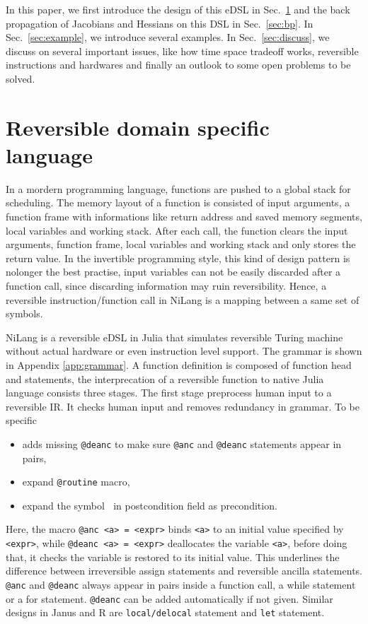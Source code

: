 \documentclass[aps,twocolumn,longbibliography,english,superscriptaddress,prr]{revtex4-1}
\newcommand{\<}{\langle}
\renewcommand{\>}{\rangle}
\newcommand{\Sec}[1]{Sec.~\ref{#1}}
\newcommand{\App}[1]{Appendix \ref{#1}}
\theoremstyle{definition}\newtheorem{definition}{\textit{Definition}}
\begin{document}
    In this paper, we first introduce the design of this eDSL in \Sec{sec:lang} and the back propagation of Jacobians and Hessians on this DSL in \Sec{sec:bp}.
    In \Sec{sec:example}, we introduce several examples.
    In \Sec{sec:discuss}, we discuss on several important issues, like how time space tradeoff works, reversible instructions and hardwares and finally an outlook to some open problems to be solved.

    \section{Reversible domain specific language}\label{sec:lang}
In a mordern programming language, functions are pushed to a global stack for scheduling. The memory layout of a function is consisted of input arguments, a function frame with informations like return address and saved memory segments, local variables and working stack. After each call, the function clears the input arguments, function frame, local variables and working stack and only stores the return value.
In the invertible programming style, this kind of design pattern is nolonger the best practise, input variables can not be easily discarded after a function call, since discarding information may ruin reversibility. Hence, a reversible instruction/function call in NiLang is a mapping between a same set of symbols.

NiLang is a reversible eDSL in Julia that simulates reversible Turing machine without actual hardware or even instruction level support. The grammar is shown in \App{app:grammar}. A function definition is composed of function head and statements, the interprecation of a reversible function to native Julia language consists three stages.
The first stage preprocess human input to a reversible IR. It checks human input and removes redundancy in grammar. To be specific
\begin{itemize}
    \item adds missing \texttt{@deanc} to make sure \texttt{@anc} and \texttt{@deanc} statements appear in pairs,
    \item expand \texttt{@routine} macro,
    \item expand the symbol \texttt{$~$} in postcondition field as precondition.
\end{itemize}

    Here, the macro \texttt{@anc <a> = <expr>} binds \texttt{<a>} to an initial value specified by \texttt{<expr>}, while \texttt{@deanc <a> = <expr>} deallocates the variable \texttt{<a>}, before doing that, it checks the variable is restored to its initial value. This underlines the difference between irreversible assign statements and reversible ancilla statements. \texttt{@anc} and \texttt{@deanc} always appear in pairs inside a function call, a while statement or a for statement. \texttt{@deanc} can be added automatically if not given. Similar designs in Janus and R are \texttt{local/delocal} statement and \texttt{let} statement.
\end{document}

